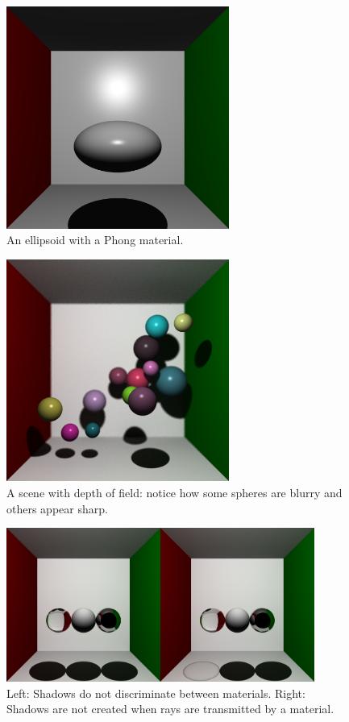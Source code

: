 \documentclass[a4paper]{article}
\begin{document}
\begin{figure}[h]
    \centering
    \includegraphics[width = 0.65\textwidth]{images/ellipsoid.png}
    \caption{An ellipsoid with a Phong material.}\label{fig:quadsurface}
\end{figure}

\begin{figure}[h]
    \centering
    \includegraphics[width = 0.65\textwidth]{images/depthoffield.png}
    \caption{A scene with depth of field: notice how some spheres are blurry and others appear sharp.}\label{fig:depthoffield}
\end{figure}

\begin{figure}[h]
    \centering
    \includegraphics[width = 0.9\textwidth]{images/glassshadow.png}
    \caption{Left: Shadows do not discriminate between materials. Right: Shadows are not created when rays are transmitted by a material.}\label{fig:glassshadow}
\end{figure}
\end{document}
